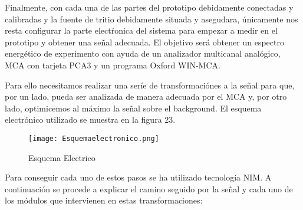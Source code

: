 Finalmente, con cada una de las partes del prototipo debidamente conectadas y calibradas y la fuente de tritio debidamente situada y asegudara, únicamente nos resta configurar la parte electŕonica del sistema para empezar a medir en el prototipo y obtener una señal adecuada. El objetivo será obtener un espectro energético de experimento con ayuda de un analizador multicanal analógico, MCA con tarjeta PCA3 y un programa Oxford WIN-MCA. 

Para ello necesitamos realizar una seríe de transformaciónes a la señal para que, por un lado,  pueda ser analizada de manera adecuada por el MCA y, por otro lado, optimicemos al máximo la señal sobre el background. El esquema electrónico utilizado se muestra en la figura 23.

\begin{figure}[hbtp]
\centering
\texttt{[image: Esquemaelectronico.png]}
\caption{Esquema Electrico~\cite{Andres}\label{electronica}}
\end{figure}

Para conseguir cada uno de estos pasos se ha utilizado tecnología NIM. A continuación se procede a explicar el camino seguido por la señal y cada uno de los módulos que intervienen en estas transformaciones:

